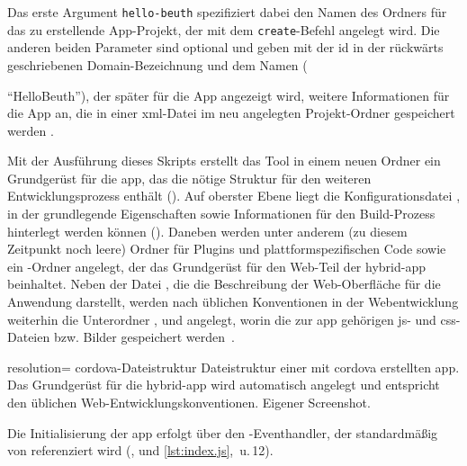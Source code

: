 Das erste Argument \lstinline|hello-beuth| spezifiziert dabei den Namen des Ordners für das zu erstellende App-Projekt, der mit dem \lstinline|create|-Befehl angelegt wird.
Die anderen beiden Parameter sind optional und geben mit der \gls{id} in der rückwärts geschriebenen Domain-Bezeichnung und dem Namen ({\mbox{\enquote{HelloBeuth}}), der später für die App angezeigt wird, weitere Informationen für die App an, die in einer \gls{xml}-Datei im neu angelegten Projekt-Ordner gespeichert werden \cite{Cordova-Docs_CLI}.

Mit der Ausführung dieses Skripts erstellt das Tool in einem neuen Ordner ein Grundgerüst für die \gls{app}, das die nötige Struktur für den weiteren Entwicklungsprozess enthält ().
Auf oberster Ebene liegt die Konfigurationsdatei , in der grundlegende Eigenschaften sowie Informationen für den Build-Prozess hinterlegt werden können ().
Daneben werden unter anderem (zu diesem Zeitpunkt noch leere) Ordner für Plugins und plattformspezifischen Code sowie ein -Ordner angelegt, der das Grundgerüst für den Web-Teil der \gls{hybrid-app} beinhaltet.
Neben der Datei , die die Beschreibung der Web-Oberfläche für die Anwendung darstellt, werden nach üblichen Konventionen in der Webentwicklung weiterhin die Unterordner ,  und  angelegt, worin die zur \gls{app} gehörigen \gls{js}- und \gls{css}-Dateien bzw. Bilder gespeichert werden~\cite{Cordova-Docs_CLI}.


	{resolution=\screenshotRes}
	{\gls{cordova}-Dateistruktur}
		{Dateistruktur einer mit \gls{cordova} erstellten \gls{app}. Das Grundgerüst für die \gls{hybrid-app} wird automatisch angelegt und entspricht den üblichen Web-Entwicklungskonventionen.}
	{Eigener Screenshot.}


	

Die Initialisierung der \gls{app} erfolgt über den -Eventhandler, der standardmäßig von  referenziert wird (,  und \autoref{lst:index.js}, \,u.\,12).

}
